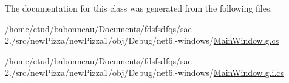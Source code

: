 The documentation for this class was generated from the following files\+:\begin{DoxyCompactItemize}
\item 
/home/etud/babonneau/\+Documents/fdsfsdfqs/sae-\/2./src/new\+Pizza/new\+Pizza1/obj/\+Debug/net6.-\/windows/\hyperlink{Debug_2net6_80-windows_2MainWindow_8g_8cs}{Main\+Window.\+g.\+cs}\item 
/home/etud/babonneau/\+Documents/fdsfsdfqs/sae-\/2./src/new\+Pizza/new\+Pizza1/obj/\+Debug/net6.-\/windows/\hyperlink{MainWindow_8g_8i_8cs}{Main\+Window.\+g.\+i.\+cs}\end{DoxyCompactItemize}

